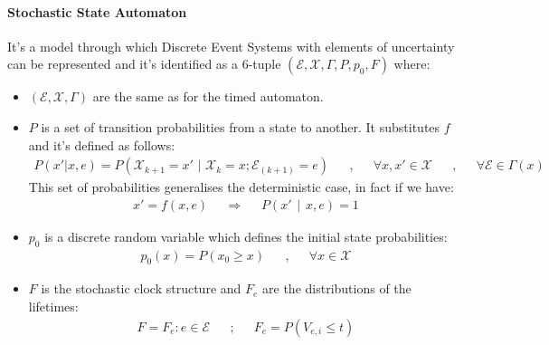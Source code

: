 \documentclass[12pt,a4paper]{article}
\begin{document}
\paragraph{Stochastic State Automaton}
It’s a model through which Discrete Event Systems with elements of uncertainty can be represented and it’s identified as a $6$-tuple $(\mathcal{E},\mathcal{X},\Gamma,P,p_0,F)$ where:
\begin{itemize}
\item $(\mathcal{E},\mathcal{X},\Gamma)$ are the same as for the timed automaton.
\item $P$ is a set of transition probabilities from a state to another. It substitutes $f$ and it’s defined as follows:
$$
\begin{matrix}
P(x'|x,e)=P(\mathcal{X}_{k+1}=x' \hspace{4pt}|\hspace{4pt} \mathcal{X}_k=x ; \mathcal{E}_(k+1)=e )&&,&&\forall x,x'\in\mathcal{X} &&,&& \forall \mathcal{E}\in \Gamma(x) 
\end{matrix}
$$ 
This set of probabilities generalises the deterministic case, in fact if we have:
$$
\begin{matrix}
x'=f(x,e)&&\Rightarrow && P(x'\hspace{5pt}|\hspace{5pt}x,e)=1
\end{matrix}
$$
\item $p_0$ is a discrete random variable which defines the initial state probabilities:
$$
\begin{matrix}
p_0(x)=P(x_0 \geq x) && , && \forall x\in \mathcal{X}
\end{matrix}
$$
\item $F$ is the stochastic clock structure and $F_e$ are the distributions of the lifetimes:
$$
\begin{matrix}
F={F_e :e \in \mathcal{E}} && ; && F_e=P(V_{e,i} \leq t)
\end{matrix}
$$
\end{itemize}
\newpage
\end{document}
